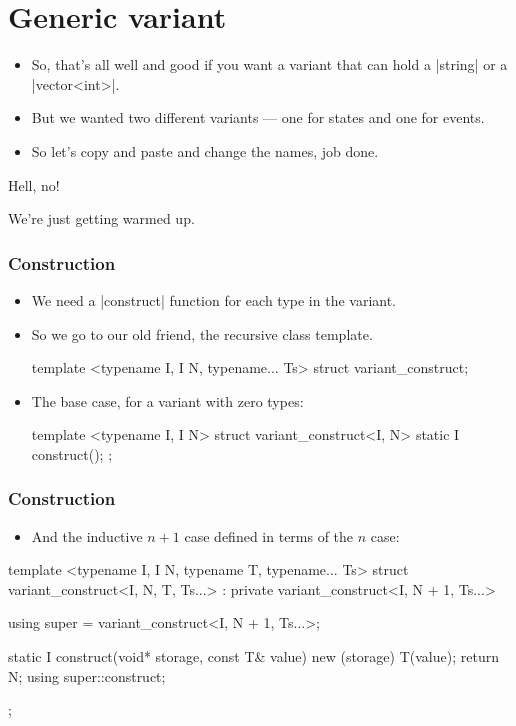 \documentclass[aspectratio=169]{beamer}
\begin{document}
\section{Generic variant}

\begin{frame}
  \begin{itemize}
  \item So, that's all well and good if you want a variant that can hold a
    \cpp|string| or a \cpp|vector<int>|.
  \item But we wanted two different variants --- one for states and one for
    events.
  \item So let's copy and paste and change the names, job done.
  \end{itemize}
\end{frame}

\begin{frame}
  \begin{center}
    \Huge{Hell, no!}
  \end{center}
  \begin{center}
    We're just getting warmed up.
  \end{center}
\end{frame}

\begin{frame}[fragile]
  \frametitle{Construction}
  \begin{itemize}
  \item We need a \cpp|construct| function for each type in the variant.
  \item So we go to our old friend, the recursive class template.
\begin{cppcode}
template <typename I, I N, typename... Ts>
struct variant_construct;
\end{cppcode}
  \item The base case, for a variant with zero types:
\begin{cppcode}
template <typename I, I N>
struct variant_construct<I, N> {
  static I construct();
};
\end{cppcode}
  \end{itemize}
\end{frame}

\begin{frame}[fragile]
  \frametitle{Construction}
  \begin{itemize}
  \item And the inductive $n+1$ case defined in terms of the $n$ case:
  \end{itemize}
\begin{cppcode}
template <typename I, I N, typename T, typename... Ts>
struct variant_construct<I, N, T, Ts...>
    : private variant_construct<I, N + 1, Ts...> {
  using super = variant_construct<I, N + 1, Ts...>;

  static I construct(void* storage, const T& value) {
    new (storage) T(value);
    return N;
  }
  using super::construct;
};
\end{cppcode}
\end{frame}
\end{document}
